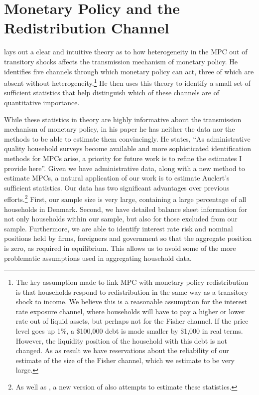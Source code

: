 \documentclass[titlepage]{\econtex}\newcommand{\texname}{ConsumptionHeterogeneity}
\begin{document}
\section{Monetary Policy and the Redistribution Channel} \label{monetary_policy}
\cite{auclert_monetary_2017} lays out a clear and intuitive theory as to how heterogeneity in the MPC out of transitory shocks affects the transmission mechanism of monetary policy. He identifies five channels through which monetary policy can act, three of which are absent without heterogeneity.\footnote{The key assumption made to link MPC with monetary policy redistribution is that households respond to redistribution in the same way as a transitory shock to income. We believe this is a reasonable assumption for the interest rate exposure channel, where households will have to pay a higher or lower rate out of liquid assets, but perhaps not for the Fisher channel. If the price level goes up 1\%, a \$100,000 debt is made smaller by \$1,000 in real terms. However, the liquidity position of the household with this debt is not changed. As as result we have reservations about the reliability of our estimate of the size of the Fisher channel, which we estimate to be very large.} He then uses this theory to identify a small set of sufficient statistics that help distinguish which of these channels are of quantitative importance.

While these statistics in theory are highly informative about the transmission mechanism of monetary policy, in his paper he has neither the data nor the methods to be able to estimate them convincingly. He states, ``As administrative quality household surveys become available and more sophisticated identification methods for MPCs arise, a priority for future work is to refine the estimates I provide here''. Given we have administrative data, along with a new method to estimate MPCs, a natural application of our work is to estimate Auclert's sufficient statistics. Our data has two significant advantages over previous efforts.\footnote{As well as \cite{auclert_monetary_2017}, a new version of \cite{fagereng_mpc_2016} also attempts to estimate these statistics.} First, our sample size is very large, containing a large percentage of all households in Denmark. Second, we have detailed balance sheet information for not only households within our sample, but also for those excluded from our sample. Furthermore, we are able to identify interest rate risk and nominal positions held by firms, foreigners and government so that the aggregate position is zero, as required in equilibrium. This allows us to avoid some of the more problematic assumptions used in aggregating household data.
\end{document}
